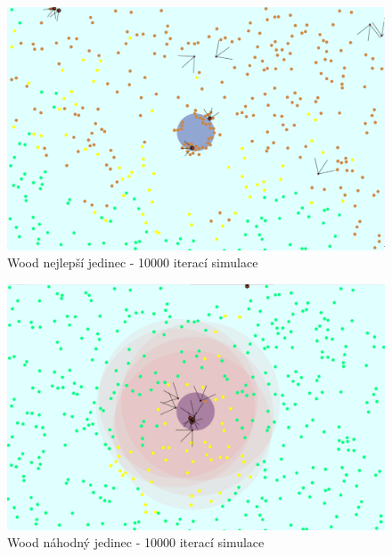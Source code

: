 	\newpage 
	\begin{figure}[p]\centering
		\includegraphics[width=\columnwidth]{../img/WoodMap/pictures/end.png}
		\caption{Wood nejlepší jedinec - 10000 iterací simulace}
		\label{obr04:bestEnd}
	\end{figure}
	\begin{figure}[p]\centering
		\includegraphics[width=\columnwidth]{../img/WoodMap/pictures/EndRandom.png}
		\caption{Wood náhodný jedinec - 10000 iterací simulace}
		\label{obr04:randomEnd}
	\end{figure}
	\clearpage
